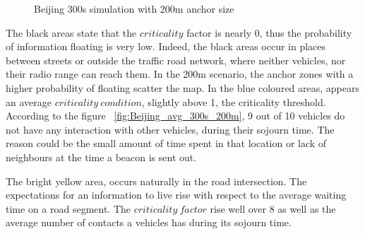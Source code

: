 \begin{figure}[h]

 	\caption{Beijing 300s simulation with 200m anchor size}
 	\label{fig:Beijing_300s_200m}
\end{figure}

The black areas state that the $criticality$ factor is nearly 0, thus the
probability of information floating is very low. Indeed, the black areas occur
in places between streets or outside the traffic road network, where neither
vehicles, nor their radio range can reach them. In the 200m scenario, the anchor
zones with a higher probability of floating scatter the map. In the blue
coloured areas, appears an average $criticality\ condition$, slightly above
1, the criticality threshold. According to the figure
~\ref{fig:Beijing_avg_300s_200m}, 9 out of 10 vehicles do not have any
interaction with other vehicles, during their sojourn time. The reason could be
the small amount of time spent in that location or lack of neighbours at the
time a beacon is sent out.

The bright yellow area, occurs naturally in the road intersection. The
expectations for an information to live rise with respect to the average waiting
time on a road segment. The $criticality\ factor$ rise well over 8 as well as
the average number of contacts a vehicles has during its sojourn time.

